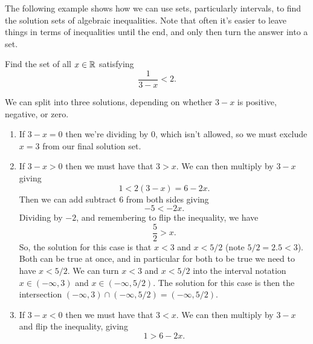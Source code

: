 \documentclass[fleqn]{LectureClass/LectureClass}
\begin{document}
    The following example shows how we can use sets, particularly intervals, to find the solution sets of algebraic inequalities.
    Note that often it's easier to leave things in terms of inequalities until the end, and only then turn the answer into a set.
    
    \begin{exm}{}{}
        Find the set of all \(x \in \mathbb{R}\) satisfying
        \begin{equation}
            \frac{1}{3 - x} < 2.
        \end{equation}
        
        We can split into three solutions, depending on whether \(3 - x\) is positive, negative, or zero.
        \begin{enumerate}
            \item If \(3 - x = 0\) then we're dividing by \(0\), which isn't allowed, so we must exclude \(x = 3\) from our final solution set.
            \item If \(3 - x > 0\) then we must have that \(3 > x\).
            We can then multiply by \(3 - x\) giving
            \begin{equation}
                1 < 2(3 - x) = 6 - 2x.
            \end{equation}
            Then we can add subtract \(6\) from both sides giving
            \begin{equation}
                -5 < -2x.
            \end{equation}
            Dividing by \(-2\), and remembering to flip the inequality, we have
            \begin{equation}
                \frac{5}{2} > x.
            \end{equation}
            So, the solution for this case is that \(x < 3\) and \(x < 5/2\) (note \(5/2 = 2.5 < 3\)).
            Both can be true at once, and in particular for both to be true we need to have \(x < 5/2\).
            We can turn \(x < 3\) and \(x < 5/2\) into the interval notation \(x \in (-\infty, 3)\) and \(x \in (-\infty, 5/2)\).
            The solution for this case is then the intersection \((-\infty, 3) \cap (-\infty, 5/2) = (-\infty, 5/2)\).
            \item If \(3 - x < 0\) then we must have that \(3 < x\).
            We can then multiply by \(3 - x\) and flip the inequality, giving
            \begin{equation}
                1 > 6 - 2x.
            \end{equation}

\end{enumerate}
\end{exm}
\end{document}

